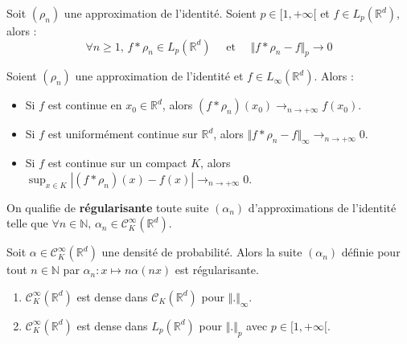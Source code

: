   \begin{theorem}
    Soit $(\rho_n)$ une approximation de l'identité. Soient $p \in [1, +\infty[$ et $f \in L_p(\mathbb{R}^d)$, alors :
    \[ \forall n \geq 1, \, f * \rho_n \in L_p(\mathbb{R}^d) \quad \text{ et } \quad \Vert f * \rho_n - f \Vert_p \longrightarrow 0 \]
  \end{theorem}

  \begin{theorem}
    Soient $(\rho_n)$ une approximation de l'identité et $f \in L_\infty(\mathbb{R}^d)$. Alors :
    \begin{itemize}
      \item Si $f$ est continue en $x_0 \in \mathbb{R}^d$, alors $(f * \rho_n)(x_0) \longrightarrow_{n \rightarrow +\infty} f(x_0)$.
      \item Si $f$ est uniformément continue sur $\mathbb{R}^d$, alors $\Vert f * \rho_n - f \Vert_\infty \longrightarrow_{n \rightarrow +\infty} 0$.
      \item Si $f$ est continue sur un compact $K$, alors $\sup_{x \in K} |(f * \rho_n)(x) - f(x)| \longrightarrow_{n \rightarrow +\infty} 0$.
    \end{itemize}
  \end{theorem}

  \begin{definition}
    On qualifie de \textbf{régularisante} toute suite $(\alpha_n)$ d'approximations de l'identité telle que $\forall n \in \mathbb{N}, \, \alpha_n \in \mathcal{C}^\infty_K(\mathbb{R}^d)$.
  \end{definition}


  \begin{example}
    Soit $\alpha \in \mathcal{C}^\infty_K(\mathbb{R}^d)$ une densité de probabilité. Alors la suite $(\alpha_n)$ définie pour tout $n \in \mathbb{N}$ par $\alpha_n : x \mapsto n \alpha(nx)$ est régularisante.
  \end{example}


  \begin{application}
    \begin{enumerate}[label=(\roman*)]
      \item $\mathcal{C}^\infty_K(\mathbb{R}^d)$ est dense dans $\mathcal{C}_K(\mathbb{R}^d)$ pour $\Vert . \Vert_\infty$.
      \item $\mathcal{C}^\infty_K(\mathbb{R}^d)$ est dense dans $L_p(\mathbb{R}^d)$ pour $\Vert . \Vert_p$ avec $p \in [1, +\infty[$.
    \end{enumerate}
  \end{application}

